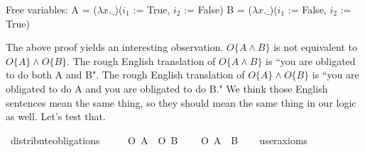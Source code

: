 \begin{isabellebody}
{  Free variables:
    A = ($\lambda x. \_$)($i_1$ := True, $i_2$ := False)
    B = ($\lambda x. \_$)($i_1$ := False, $i_2$ := True) \color{black}%
}\isanewline
%
%
\endisatagproof
{\isafoldproof}%
%
\isadelimproof
%
\endisadelimproof
%
\begin{isamarkuptext}%
The above proof yields an interesting observation.  $O \{ A \wedge B \} $ is not equivalent to 
$O\{A\} \wedge O\{B\}$. The rough English translation of  $O \{ A \wedge B \} $ is ``you are obligated to 
do both A and B". The rough English translation of $O\{A\} \wedge O\{B\}$ is ``you are obligated to do A 
and you are obligated to do B." We think those English sentences mean the same thing, so they should mean 
the same thing in our logic as well. Let's test that.%
\end{isamarkuptext}\isamarkuptrue%
\isamarkupfalse%
\ distribute{\isacharunderscore}obligations{\isacharcolon}\isanewline
\ \ \ \ {\isachardoublequoteopen}{\isasymTurnstile}\ {\isacharparenleft}O\ {\isacharbraceleft}A{\isacharbraceright}\ \isactrlbold {\isasymand}\ O\ {\isacharbraceleft}B{\isacharbraceright}{\isacharparenright}{\isachardoublequoteclose}\isanewline
\ \ \ {\isachardoublequoteopen}{\isasymTurnstile}\ O\ {\isacharbraceleft}A\ \isactrlbold {\isasymand}\ B{\isacharbraceright}{\isachardoublequoteclose}\isanewline
\ \ \isamarkupfalse%
\ {\isacharbrackleft}user{\isacharunderscore}axioms{\isacharbrackright}%
\isadelimproof
\ %
\endisadelimproof
%
\isatagproof
{}\isamarkupfalse%
\isanewline
%
\end{isabellebody}
